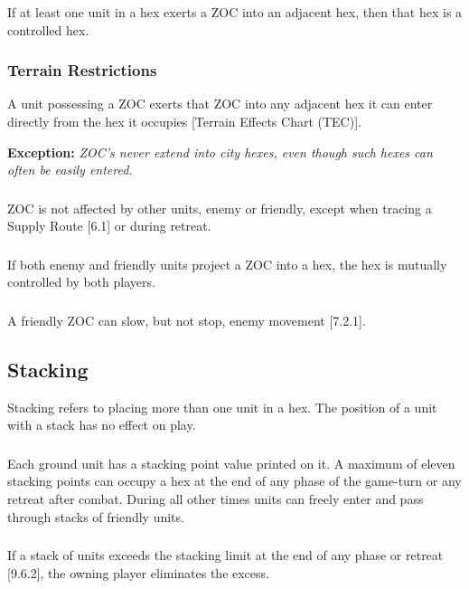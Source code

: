 If at least one unit in a hex exerts a ZOC into an adjacent hex, then that hex is a controlled hex.

\subsubsection{Terrain Restrictions}
A unit possessing a ZOC exerts that ZOC into any adjacent hex it can enter directly from the hex it occupies [Terrain Effects Chart (TEC)].

\textbf{Exception:} \textit{ZOC's never extend into city hexes, even though such hexes can often be easily entered.}

\subsubsection{}
ZOC is not affected by other units, enemy or friendly, except when tracing a Supply Route [6.1] or during retreat.

\subsubsection{}
If both enemy and friendly units project a ZOC into a hex, the hex is mutually controlled by both players.

\subsubsection{}
A friendly ZOC can slow, but not stop, enemy movement [7.2.1].

\subsection{Stacking}
Stacking refers to placing more than one unit in a hex. The position of a unit with a stack has no effect on play.

\subsubsection{}
Each ground unit has a stacking point value printed on it. A maximum of eleven stacking points can occupy a hex at the end of any phase of the game-turn or any retreat after combat. During all other times units can freely enter and pass through stacks of friendly units.

\subsubsection{}
If a stack of units exceeds the stacking limit at the end of any phase or retreat [9.6.2], the owning player eliminates the excess.


